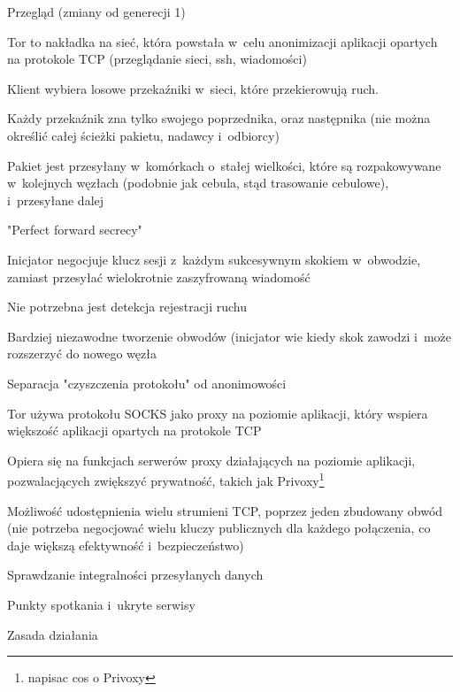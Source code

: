 \begin{description}
  \item Przegląd (zmiany od generecji 1)
  \begin{description}
   \item Tor to nakładka na sieć, która powstała w~celu anonimizacji aplikacji opartych na protokole TCP (przeglądanie sieci, ssh, wiadomości)
   \item Klient wybiera losowe przekaźniki w~sieci, które przekierowują ruch.
   \item Każdy przekaźnik zna tylko swojego poprzednika, oraz następnika (nie można określić całej ścieżki pakietu, nadawcy i~odbiorcy)
   \item Pakiet jest przesyłany w~komórkach o~stałej wielkości, które są rozpakowywane w~kolejnych węzłach (podobnie jak cebula, stąd trasowanie cebulowe), i~przesyłane dalej
   \item "Perfect forward secrecy"
   \begin{description}
    \item Inicjator negocjuje klucz sesji z~każdym sukcesywnym skokiem w~obwodzie, zamiast przesyłać wielokrotnie zaszyfrowaną wiadomość
    \item Nie potrzebna jest detekcja rejestracji ruchu
    \item Bardziej niezawodne tworzenie obwodów (inicjator wie kiedy skok zawodzi i~może rozszerzyć do nowego węzła
   \end{description}
   \item Separacja "czyszczenia protokołu" od anonimowości
   \begin{description}
    \item Tor używa protokołu SOCKS jako proxy na poziomie aplikacji, który wspiera większość aplikacji opartych na protokole TCP
    \item Opiera się na funkcjach serwerów proxy działających na poziomie aplikacji, pozwalacjących zwiększyć prywatność, takich jak Privoxy\footnote{napisac cos o Privoxy}
   \end{description}
   \item Możliwość udostępnienia wielu strumieni TCP, poprzez jeden zbudowany obwód (nie potrzeba negocjować wielu kluczy publicznych dla każdego połączenia, co daje większą efektywność i~bezpieczeństwo)
   \item Sprawdzanie integralności przesyłanych danych
   \item Punkty spotkania i~ukryte serwisy
  \end{description}
  \item Zasada działania

\end{description}
